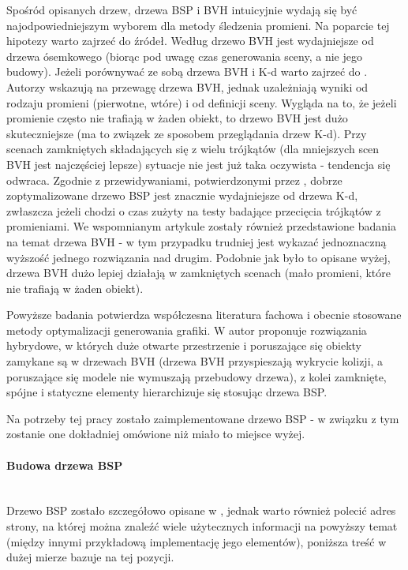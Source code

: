 Spośród opisanych drzew, drzewa BSP i BVH intuicyjnie wydają się być najodpowiedniejszym wyborem dla metody śledzenia promieni. Na poparcie tej hipotezy warto zajrzeć do źródeł. Według \cite{bvhvsoctee} drzewo BVH jest wydajniejsze od drzewa ósemkowego (biorąc pod uwagę czas generowania sceny, a nie jego budowy). Jeżeli porównywać ze sobą drzewa BVH i K-d warto zajrzeć do \cite{bspvskd, bvhvskd2}. Autorzy wskazują na przewagę drzewa BVH, jednak uzależniają wyniki od rodzaju promieni (pierwotne, wtóre) i od definicji sceny. Wygląda na to, że jeżeli promienie często nie trafiają w żaden obiekt, to drzewo BVH jest dużo skuteczniejsze (ma to związek ze sposobem przeglądania drzew K-d). Przy scenach zamkniętych składających się z wielu trójkątów (dla mniejszych scen BVH jest najczęściej lepsze) sytuacje nie jest już taka oczywista - tendencja się odwraca. Zgodnie z przewidywaniami, potwierdzonymi przez \cite{bspvskd}, dobrze zoptymalizowane drzewo BSP jest znacznie wydajniejsze od drzewa K-d, zwłaszcza jeżeli chodzi o czas zużyty na testy badające przecięcia trójkątów z promieniami. We wspomnianym artykule zostały również przedstawione badania na temat drzewa BVH - w tym przypadku trudniej jest wykazać jednoznaczną wyższość jednego rozwiązania nad drugim. Podobnie jak było to opisane wyżej, drzewa BVH dużo lepiej działają w zamkniętych scenach (mało promieni, które nie trafiają w żaden obiekt). 

Powyższe badania potwierdza współczesna literatura fachowa i obecnie stosowane metody optymalizacji generowania grafiki. W \cite{trees} autor proponuje rozwiązania hybrydowe, w których duże otwarte przestrzenie i poruszające się obiekty zamykane są w drzewach BVH (drzewa BVH przyspieszają wykrycie kolizji, a poruszające się modele nie wymuszają przebudowy drzewa), z kolei zamknięte, spójne i statyczne elementy hierarchizuje się stosując drzewa BSP.

Na potrzeby tej pracy zostało zaimplementowane drzewo BSP - w związku z tym zostanie one dokładniej omówione niż miało to miejsce wyżej.

\paragraph{Budowa drzewa BSP}\mbox{} \\

Drzewo BSP zostało szczegółowo opisane w \cite{trees}, jednak warto również polecić adres strony\cite{bspfaq}, na której można znaleźć wiele użytecznych informacji na powyższy temat (między innymi przykładową implementację jego elementów), poniższa treść w dużej mierze bazuje na tej pozycji.

